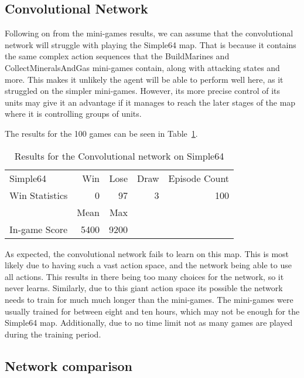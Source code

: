 \subsection{Convolutional Network}

Following on from the mini-games results, we can assume that the convolutional
network will struggle with playing the Simple64 map. That is because it contains
the same complex action sequences that the BuildMarines and
CollectMineralsAndGas mini-games contain, along with attacking states and more.
This makes it unlikely the agent will be able to perform well here, as it
struggled on the simpler mini-games. However, its more precise control of its
units may give it an advantage if it manages to reach the later stages of the
map where it is controlling groups of units.

The results for the 100 games can be seen in Table~\ref{tab:cnn_simple}.

\begin{table}[h]
    \centering
    \begin{tabular}{@{}lrrrr@{}}
        \toprule
        Simple64        & Win  & Lose  & Draw & Episode Count \\
        Win Statistics  & 0    & 97    & 3 & 100           \\
        \midrule
        \midrule
                      & Mean & Max  \\
        In-game Score & 5400 & 9200 \\
 \bottomrule
    \end{tabular}
    \caption{Results for the Convolutional network on Simple64}%
    \label{tab:cnn_simple}%
\end{table}

As expected, the convolutional network fails to learn on this map. This is most
likely due to having such a vast action space, and the network being able to use
all actions. This results in there being too many choices for the network, so it
never learns. Similarly, due to this giant action space its possible the network
needs to train for much much longer than the mini-games. The mini-games were
usually trained for between eight and ten hours, which may not be enough for the
Simple64 map. Additionally, due to no time limit not as many games are played
during the training period.

\subsection{Network comparison}

